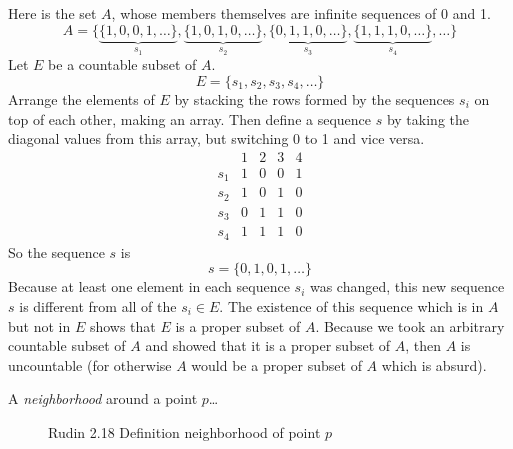 \begin{proof-dan}
  Here is the set $A$, whose members themselves are infinite sequences of 0 and 1.
  \begin{equation*}
    A=\{\underbrace{\{1,0,0,1,\dots\}}_{s_{1}},\underbrace{\{1,0,1,0,\dots\}}_{s_{2}},\underbrace{\{0,1,1,0,\dots\}}_{s_{3}},\underbrace{\{1,1,1,0,\dots\}}_{s_{4}},\dots\}
  \end{equation*}
  Let $E$ be a countable subset of $A$.
  \begin{equation*}
    E=\{s_{1},s_{2},s_{3},s_{4},\dots\}
  \end{equation*}
  Arrange the elements of $E$ by stacking the rows formed by the sequences $s_{i}$ on top of each other, making an array.
  Then define a sequence $s$ by taking the diagonal values from this array, but switching 0 to 1 and vice versa.
  \begin{equation*}
    \begin{array}{c|cccc} %
      & 1 & 2 & 3 & 4 \\
      \hline %
      s_{1} & 1 & 0 & 0 & 1 \\
      s_{2} & 1 & 0 & 1 & 0 \\
      s_{3} & 0 & 1 & 1 & 0 \\
      s_{4} & 1 & 1 & 1 & 0
    \end{array}
  \end{equation*}
  So the sequence $s$ is
  \begin{equation*}
    s=\{0,1,0,1,\dots\}
  \end{equation*}
  Because at least one element in each sequence $s_{i}$ was changed, this new sequence $s$ is different from all of the $s_{i}\in E$.
  The existence of this sequence which is in $A$ but not in $E$ shows that $E$ is a proper subset of $A$.
  Because we took an arbitrary countable subset of $A$ and showed that it is a proper subset of $A$, then $A$ is uncountable (for otherwise $A$ would be a proper subset of $A$ which is absurd).
\end{proof-dan}

\begin{defn-dan}
  A \textit{neighborhood} around a point $p$\dots
  \begin{figure}[H]
    \begin{center}
      \caption{Rudin 2.18 Definition neighborhood of point $p$}
    \end{center}
  \end{figure}
\end{defn-dan}

